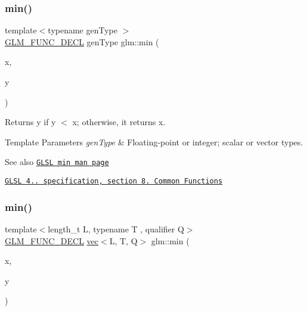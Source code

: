 \subsubsection{\texorpdfstring{min()}{min()}\hspace{0.1cm}{\footnotesize\ttfamily [1/3]}}
{\footnotesize\ttfamily template$<$typename gen\+Type $>$ \\
\hyperlink{setup_8hpp_ab2d052de21a70539923e9bcbf6e83a51}{G\+L\+M\+\_\+\+F\+U\+N\+C\+\_\+\+D\+E\+CL} gen\+Type glm\+::min (\begin{DoxyParamCaption}\item[{gen\+Type}]{x,  }\item[{gen\+Type}]{y }\end{DoxyParamCaption})}

Returns y if y $<$ x; otherwise, it returns x.


\begin{DoxyTemplParams}{Template Parameters}
{\em gen\+Type} & Floating-\/point or integer; scalar or vector types.\\
\hline
\end{DoxyTemplParams}
\begin{DoxySeeAlso}{See also}
\href{http://www.opengl.org/sdk/docs/manglsl/xhtml/min.xml}{\tt G\+L\+SL min man page} 

\href{http://www.opengl.org/registry/doc/GLSLangSpec.4.20.8.pdf}{\tt G\+L\+SL 4.. specification, section 8. Common Functions} 
\end{DoxySeeAlso}
\mbox{\label{group__core__func__common_ga2d274e8b537c173dba983331a2620736}} 
\subsubsection{\texorpdfstring{min()}{min()}\hspace{0.1cm}{\footnotesize\ttfamily [2/3]}}
{\footnotesize\ttfamily template$<$length\+\_\+t L, typename T , qualifier Q$>$ \\
\hyperlink{setup_8hpp_ab2d052de21a70539923e9bcbf6e83a51}{G\+L\+M\+\_\+\+F\+U\+N\+C\+\_\+\+D\+E\+CL} \hyperlink{structglm_1_1vec}{vec}$<$L, T, Q$>$ glm\+::min (\begin{DoxyParamCaption}\item[{\hyperlink{structglm_1_1vec}{vec}$<$ L, T, Q $>$ const \&}]{x,  }\item[{T}]{y }\end{DoxyParamCaption})}

